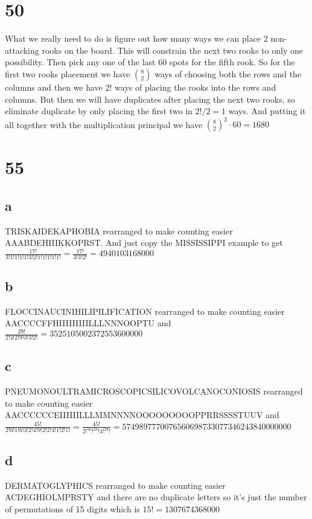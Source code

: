 \documentclass{article}
\begin{document}
\section*{50}
What we really need to do is figure out how many ways we can place 2 non-attacking rooks on the board. This will constrain the next two rooks to only one possibility. Then pick any one of the last 60 spots for the fifth rook. So for the first two rooks placement we have ${8 \choose 2}$ ways of choosing both the rows and the columns and then we have $2!$ ways of placing the rooks into the rows and columns. But then we will have duplicates after placing the next two rooks, so eliminate duplicate by only placing the first two in $2!/2=1$ ways. And putting it all together with the multiplication principal we have ${8 \choose 2}^2\cdot60=1680$
\section*{55}
\subsection*{a}
TRISKAIDEKAPHOBIA rearranged to make counting easier AAABDEHIIIKKOPRST. And just copy the MISSISSIPPI example to get $\frac{17!}{3!1!1!1!1!3!2!1!1!1!1!1!}=\frac{17!}{3!3!2!}=4940103168000$
\subsection*{b}
FLOCCINAUCINIHILIPILIFICATION rearranged to make counting easier AACCCCFFHIIIIIIIIILLLNNNOOPTU and $\frac{29!}{2!4!2!9!3!3!2!}=3525105002372553600000$
\subsection*{c}
PNEUMONOULTRAMICROSCOPICSILICOVOLCANOCONIOSIS rearranged to make counting easier AACCCCCCEIIIIIILLLMMNNNNOOOOOOOOOPPRRSSSSTUUV and $\frac{45!}{2!6!1!6!3!2!4!9!2!2!4!1!2!1!}=\frac{45!}{2!^56!^23!4!^29!}=5749897770076560698733077346243840000000$
\subsection*{d}
DERMATOGLYPHICS rearranged to make counting easier ACDEGHIOLMPRSTY and there are no duplicate letters so it's just the number of permutations of 15 digits which is $15!=1307674368000$
\end{document}
